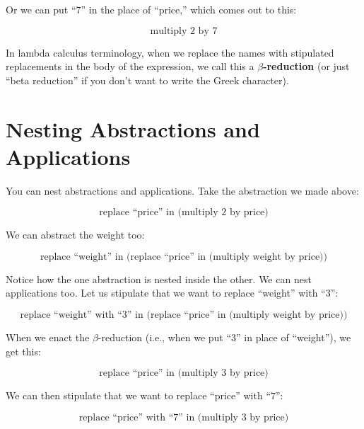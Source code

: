\documentclass{book}
\numberwithin{equation}{chapter}
\newcommand{\vocab}{\textbf}
\begin{document}
\noindent
Or we can put ``$7$'' in the place of ``price,'' which comes out to this:

\begin{equation}
\text{multiply 2 by 7}
\end{equation}

\noindent
In lambda calculus terminology, when we replace the names with stipulated replacements in the body of the expression, we call this a \vocab{$\beta$-reduction} (or just ``beta reduction'' if you don't want to write the Greek character).


\section{Nesting Abstractions and Applications}

You can nest abstractions and applications. Take the abstraction we made above:

\begin{equation}
\text{replace ``price'' in (multiply 2 by price)}
\end{equation}

\noindent
We can abstract the weight too:

\begin{equation}
\text{replace ``weight'' in (replace ``price'' in (multiply weight by price))}
\end{equation}

\noindent
Notice how the one abstraction is nested inside the other. We can nest applications too. Let us stipulate that we want to replace ``weight'' with ``$3$'':

\begin{equation}
\text{replace ``weight'' with ``3'' in (replace ``price'' in (multiply weight by price))}
\end{equation}

\noindent
When we enact the $\beta$-reduction (i.e., when we put ``$3$'' in place of ``weight''), we get this:

\begin{equation}
\text{replace ``price'' in (multiply 3 by price)}
\end{equation}

\noindent
We can then stipulate that we want to replace ``price'' with ``$7$'':

\begin{equation}
\text{replace ``price'' with ``7'' in (multiply 3 by price)}
\end{equation}
\end{document}

